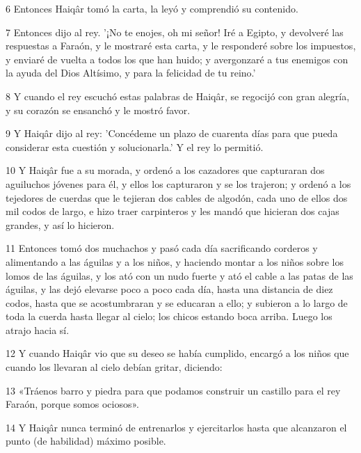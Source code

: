 \par 6 Entonces Haiqâr tomó la carta, la leyó y comprendió su contenido.

\par 7 Entonces dijo al rey. '¡No te enojes, oh mi señor! Iré a Egipto, y devolveré las respuestas a Faraón, y le mostraré esta carta, y le responderé sobre los impuestos, y enviaré de vuelta a todos los que han huido; y avergonzaré a tus enemigos con la ayuda del Dios Altísimo, y para la felicidad de tu reino.'

\par 8 Y cuando el rey escuchó estas palabras de Haiqâr, se regocijó con gran alegría, y su corazón se ensanchó y le mostró favor.

\par 9 Y Haiqâr dijo al rey: 'Concédeme un plazo de cuarenta días para que pueda considerar esta cuestión y solucionarla.' Y el rey lo permitió.

\par 10 Y Haiqâr fue a su morada, y ordenó a los cazadores que capturaran dos aguiluchos jóvenes para él, y ellos los capturaron y se los trajeron; y ordenó a los tejedores de cuerdas que le tejieran dos cables de algodón, cada uno de ellos dos mil codos de largo, e hizo traer carpinteros y les mandó que hicieran dos cajas grandes, y así lo hicieron.

\par 11 Entonces tomó dos muchachos y pasó cada día sacrificando corderos y alimentando a las águilas y a los niños, y haciendo montar a los niños sobre los lomos de las águilas, y los ató con un nudo fuerte y ató el cable a las patas de las águilas, y las dejó elevarse poco a poco cada día, hasta una distancia de diez codos, hasta que se acostumbraran y se educaran a ello; y subieron a lo largo de toda la cuerda hasta llegar al cielo; los chicos estando boca arriba. Luego los atrajo hacia sí.

\par 12 Y cuando Haiqâr vio que su deseo se había cumplido, encargó a los niños que cuando los llevaran al cielo debían gritar, diciendo:

\par 13 «Tráenos barro y piedra para que podamos construir un castillo para el rey Faraón, porque somos ociosos».

\par 14 Y Haiqâr nunca terminó de entrenarlos y ejercitarlos hasta que alcanzaron el punto (de habilidad) máximo posible.


